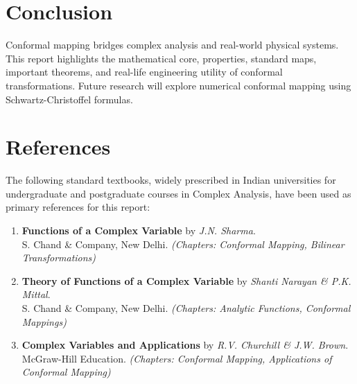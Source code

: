 \documentclass[12pt,a4paper]{article}
\begin{document}
\section{Conclusion}
Conformal mapping bridges complex analysis and real-world physical systems. This report highlights the mathematical core, properties, standard maps, important theorems, and real-life engineering utility of conformal transformations. Future research will explore numerical conformal mapping using Schwartz-Christoffel formulas.

\section{References}
The following standard textbooks, widely prescribed in Indian universities for undergraduate and postgraduate courses in Complex Analysis, have been used as primary references for this report:

\begin{enumerate}
    \item \textbf{Functions of a Complex Variable} by \textit{J.N. Sharma}. \\
    S. Chand \& Company, New Delhi. \textit{(Chapters: Conformal Mapping, Bilinear Transformations)}

    \item \textbf{Theory of Functions of a Complex Variable} by \textit{Shanti Narayan \& P.K. Mittal}. \\
    S. Chand \& Company, New Delhi. \textit{(Chapters: Analytic Functions, Conformal Mappings)}

    \item \textbf{Complex Variables and Applications} by \textit{R.V. Churchill \& J.W. Brown}. \\
    McGraw-Hill Education. \textit{(Chapters: Conformal Mapping, Applications of Conformal Mapping)}
\end{enumerate}
\end{document}
